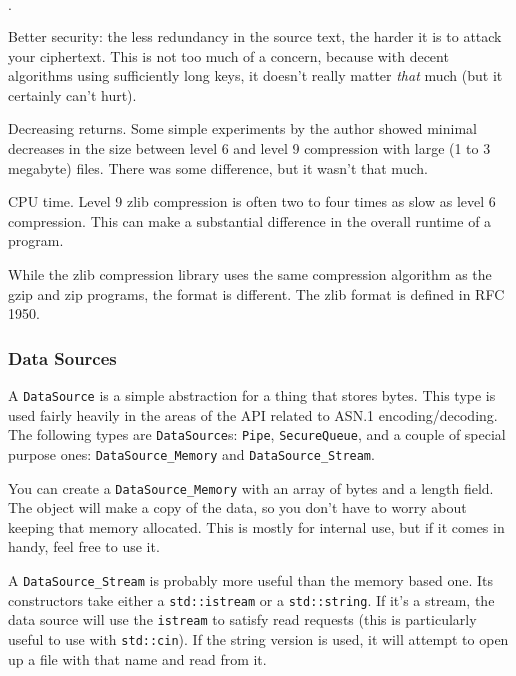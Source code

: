 \documentclass{article}
\newcommand{\type}[1]{\texttt{#1}}
\begin{document}
\begin{list}{$\cdot$}
  \item Better security: the less redundancy in the source text, the harder it
        is to attack your ciphertext. This is not too much of a concern,
        because with decent algorithms using sufficiently long keys, it doesn't
        really matter \emph{that} much (but it certainly can't hurt).
  \item

  \item Decreasing returns. Some simple experiments by the author showed
        minimal decreases in the size between level 6 and level 9 compression
        with large (1 to 3 megabyte) files. There was some difference, but it
        wasn't that much.

  \item CPU time. Level 9 zlib compression is often two to four times as slow
        as level 6 compression. This can make a substantial difference in the
        overall runtime of a program.
\end{list}

While the zlib compression library uses the same compression algorithm as the
gzip and zip programs, the format is different. The zlib format is defined in
RFC 1950.

\subsubsection{Data Sources}

A \type{DataSource} is a simple abstraction for a thing that stores bytes. This
type is used fairly heavily in the areas of the API related to ASN.1
encoding/decoding. The following types are \type{DataSource}s: \type{Pipe},
\type{SecureQueue}, and a couple of special purpose ones:
\type{DataSource\_Memory} and \type{DataSource\_Stream}.

You can create a \type{DataSource\_Memory} with an array of bytes and a length
field. The object will make a copy of the data, so you don't have to worry
about keeping that memory allocated. This is mostly for internal use, but if it
comes in handy, feel free to use it.

A \type{DataSource\_Stream} is probably more useful than the memory based
one. Its constructors take either a \type{std::istream} or a
\type{std::string}. If it's a stream, the data source will use the
\type{istream} to satisfy read requests (this is particularly useful to use
with \type{std::cin}). If the string version is used, it will attempt to open
up a file with that name and read from it.
\end{document}
